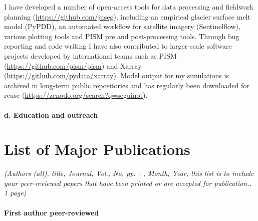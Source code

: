 \documentclass{article}
\begin{document}
    I have developed a number of open-access tools for data processing and
    fieldwork planning (\url{https://github.com/juseg}), including an empirical
    glacier surface melt model (PyPDD), an automated workflow for satellite
    imagery (Sentinelflow), various plotting tools and PISM pre and
    post-processing tools. Through bug reporting and code writing I have also
    contributed to larger-scale software projects developed by international
    teams such as PISM (\url{https://github.com/pism/pism}) and Xarray
    (\url{https://github.com/pydata/xarray}). Model output for my simulations is
    archived in long-term public repositories and has regularly been downloaded
    for reuse (\url{https://zenodo.org/search?q=seguinot}).

\paragraph{d. Education and outreach}



\section{List of Major Publications}

    \emph{(Authors (all), title, Journal,  Vol., No, pp.   -   , Month, Year,
          this list is to include your peer-reviewed papers that have been printed or
          are accepted for publication., 1 page)}

\paragraph{First author peer-reviewed}

    
\end{document}
